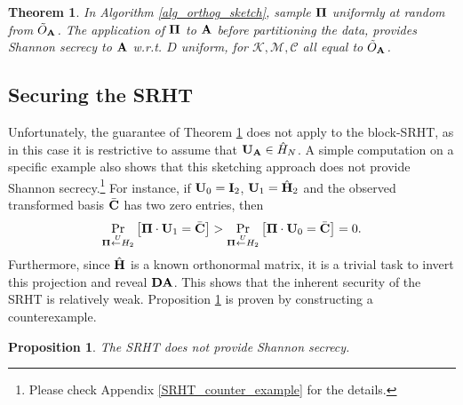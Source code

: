 \documentclass[journal,letterpaper,onecolumn,twoside,nofonttune]{IEEEtran}
\newcommand{\Cc}{\mathcal{C}}
\newcommand{\K}{\mathcal{K}}
\newcommand{\M}{\mathcal{M}}
\newcommand{\Otil}{\tilde{O}}
\newcommand{\Ub}{\bold{U}}
\newcommand{\Pibold}{\bold{\Pi}}
\newcommand{\Ab}{\bold{A}}
\newcommand{\Cb}{\bold{C}}
\newcommand{\Db}{\bold{D}}
\newcommand{\Ib}{\bold{I}}
\newcommand{\Hbh}{\hat{\bold{H}}}
\newcommand{\getsU}{\overset{\ U}{\gets}}
\newtheorem{Thm}{Theorem}
\newtheorem{Prop}{Proposition}
\begin{document}
\begin{Thm}
\label{Shan_secr_thm}
In Algorithm \ref{alg_orthog_sketch}, sample $\Pibold$ uniformly at random from $\Otil_\Ab$. The application of $\Pibold$ to $\Ab$ before partitioning the data, provides Shannon secrecy to $\Ab$ w.r.t. $D$ uniform, for $\K,\M,\Cc$ all equal to $\Otil_\Ab$.
\end{Thm}

\subsection{Securing the SRHT}
\label{security_sec_SRHT}

Unfortunately, the guarantee of Theorem \ref{Shan_secr_thm} does not apply to the block-SRHT, as in this case it is restrictive to assume that $\Ub_\Ab\in \hat{H}_N$. A simple computation on a specific example also shows that this sketching approach does not provide Shannon secrecy.\footnote{Please check Appendix \ref{SRHT_counter_example} for the details.} For instance, if $\Ub_0=\Ib_2$, $\Ub_1=\Hbh_2$ and the observed transformed basis $\bar{\Cb}$ has two zero entries, then
$$ \Pr_{\Pibold\getsU H_2}\left[\Pibold\cdot\Ub_1=\bar{\Cb}\right] > \Pr_{\Pibold\getsU H_2}\left[\Pibold\cdot\Ub_0=\bar{\Cb}\right]=0. $$
Furthermore, since $\Hbh$ is a known orthonormal matrix, it is a trivial task to invert this projection and reveal $\Db\Ab$. This shows that the inherent security of the SRHT is relatively weak. Proposition \ref{insecurity_Prop} is proven by constructing a counterexample.

\begin{Prop}
\label{insecurity_Prop}
  The SRHT does not provide Shannon secrecy.
\end{Prop}
\end{document}
